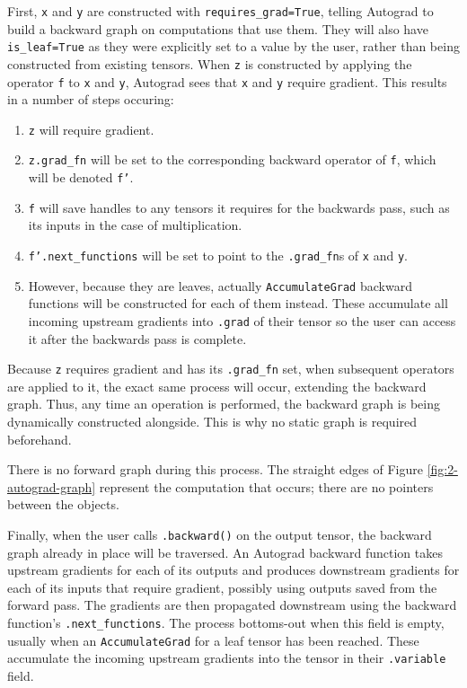 First, \texttt{x} and \texttt{y} are constructed with \texttt{requires\_grad=True},
 telling Autograd to build a backward graph on computations that use them.
They will also have \texttt{is\_leaf=True} as they were explicitly set to a value by the user, rather than being constructed from existing tensors.
When \texttt{z} is constructed by applying the operator \texttt{f} to \texttt{x} and \texttt{y}, Autograd sees that \texttt{x} and \texttt{y} require gradient.
This results in a number of steps occuring:
\begin{enumerate}[topsep=0.1em]
    \item \texttt{z} will require gradient.
    \item \texttt{z.grad\_fn} will be set to the corresponding backward operator of \texttt{f}, which will be denoted \texttt{f'}.
    \item \texttt{f} will save handles to any tensors it requires for the backwards pass, such as its inputs in the case of multiplication.
    \item \texttt{f'.next\_functions} will be set to point to the \texttt{.grad\_fn}s of \texttt{x} and \texttt{y}.
    \item However, because they are leaves, actually \texttt{AccumulateGrad} backward functions will be constructed for each of them instead.
    These accumulate all incoming upstream gradients into \texttt{.grad} of their tensor so the user can access it after the backwards pass is complete.
\end{enumerate}
Because \texttt{z} requires gradient and has its \texttt{.grad\_fn} set, when subsequent operators are applied to it, the exact same process will occur, extending the backward graph.
Thus, any time an operation is performed, the backward graph is being dynamically constructed alongside.
This is why no static graph is required beforehand.

There is no forward graph during this process.
The straight edges of Figure \ref{fig:2-autograd-graph} represent the computation that occurs; there are no pointers between the objects.

Finally, when the user calls \texttt{.backward()} on the output tensor, the backward graph already in place will be traversed.
An Autograd backward function takes upstream gradients for each of its outputs and produces downstream gradients for each of its inputs that require gradient, possibly using outputs saved from the forward pass.
The gradients are then propagated downstream using the backward function's \texttt{.next\_functions}.
The process bottoms-out when this field is empty, usually when an \texttt{AccumulateGrad} for a leaf tensor has been reached.
These accumulate the incoming upstream gradients into the tensor in their \texttt{.variable} field.

